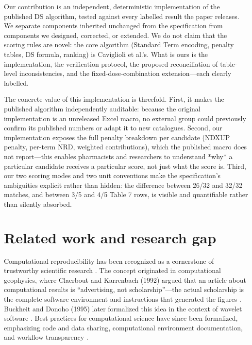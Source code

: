 \documentclass[twocolumn,a4paper]{elsarticle}
\begin{document}
Our contribution is an independent, deterministic implementation of the published DS algorithm, tested against every labelled result the paper releases. We separate components inherited unchanged from the specification from components we designed, corrected, or extended. We do not claim that the scoring rules are novel: the core algorithm (Standard Term encoding, penalty tables, DS formula, ranking) is Caviglioli et al.'s. What is ours is the implementation, the verification protocol, the proposed reconciliation of table-level inconsistencies, and the fixed-dose-combination extension---each clearly labelled.

The concrete value of this implementation is threefold. First, it makes the published algorithm independently auditable: because the original implementation is an unreleased Excel macro, no external group could previously confirm its published numbers or adapt it to new catalogues. Second, our implementation exposes the full penalty breakdown per candidate (NDXUP penalty, per-term NRD, weighted contributions), which the published macro does not report---this enables pharmacists and researchers to understand *why* a particular candidate receives a particular score, not just what the score is. Third, our two scoring modes and two unit conventions make the specification's ambiguities explicit rather than hidden: the difference between 26/32 and 32/32 matches, and between 3/5 and 4/5 Table 7 rows, is visible and quantifiable rather than silently absorbed.

\section{Related work and research gap}
\label{sec:related}

Computational reproducibility has been recognized as a cornerstone of trustworthy scientific research \citep{nationalacademies2019reproducibility,peng2011reproducible,peng2006reproducible}. The concept originated in computational geophysics, where Claerbout and Karrenbach (1992) argued that an article about computational results is ``advertising, not scholarship''---the actual scholarship is the complete software environment and instructions that generated the figures \citep{claerbout1992electronic}. Buckheit and Donoho (1995) later formalized this idea in the context of wavelet software \citep{buckheit1995wavelab}. Best practices for computational science have since been formalized, emphasizing code and data sharing, computational environment documentation, and workflow transparency \citep{stodden2014reproducible,stodden2014best,wilson2014best,taschuk2017ten,wilson2017good}.
\end{document}
